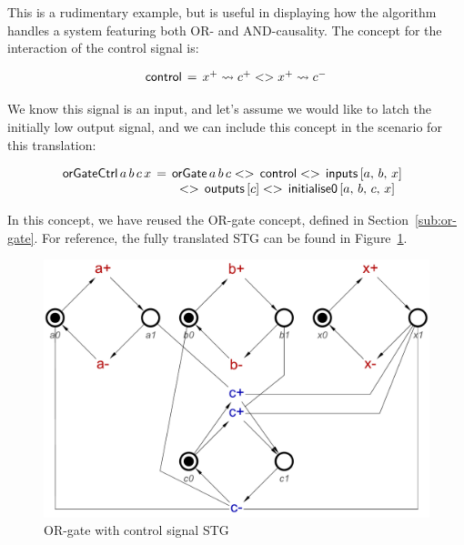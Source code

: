 \documentclass[british,conference,compsoc]{IEEEtran}
\begin{document}
This is a rudimentary example, but is useful in displaying how the algorithm
handles a system featuring both OR- and AND-causality. The concept for 
the interaction of the control signal is:

\[
\begin{array}{lcl}
\mathsf{control}&\hspace{-2mm}=&\hspace{-2mm}x^{+} \rightsquigarrow c^{+} <> x^{+} \rightsquigarrow c^{-} 
\end{array}
\]

We know this signal is an input, and let's assume we would like to latch
the initially low output signal, and we can include this concept in the 
scenario for this translation:

\[
\begin{array}{lcl}
\hspace{-2mm}\mathsf{orGateCtrl}\,  a \, b \, c \, x &\hspace{-2mm}=&\hspace{-2mm}\mathsf{orGate}\, a\, b\, c <>\, \mathsf{control}
<>\, \mathsf{inputs}\, [a,\, b,\, x] \\
&& <> \, \mathsf{outputs} \,  [c] <>\, \mathsf{initialise0}\, [a,\, b,\, c,\, x]
\end{array}
\]

In this concept, we have reused the OR-gate concept, defined in Section~\ref{sub:or-gate}. 
For reference, the fully translated STG can be found in Figure~\ref{fig:or-gate-ctrl}.


\begin{figure}[h]
\begin{centering}
\includegraphics[scale=0.25]{Images/or-gate-ctrl-stg}
\par\end{centering}
\protect\caption{\label{fig:or-gate-ctrl} OR-gate with control signal STG}
\end{figure}
\end{document}
